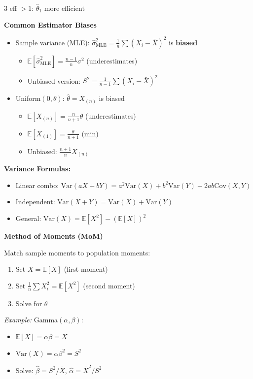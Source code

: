 \documentclass[10pt,letterpaper]{article}
\newcommand{\Var}{\text{Var}}
\newcommand{\Cov}{\text{Cov}}
\newcommand{\E}{\mathbb{E}}
\begin{document}
\begin{multicols}{3}
eff $> 1$: $\hat{\theta}_1$ more efficient

\textbf{Common Estimator Biases}

\begin{itemize}
\item Sample variance (MLE): $\hat{\sigma}^2_{\text{MLE}} = \frac{1}{n}\sum(X_i-\bar{X})^2$ is \textbf{biased}
  \begin{itemize}
  \item $\E[\hat{\sigma}^2_{\text{MLE}}] = \frac{n-1}{n}\sigma^2$ (underestimates)
  \item Unbiased version: $S^2 = \frac{1}{n-1}\sum(X_i-\bar{X})^2$
  \end{itemize}
\item Uniform$(0, \theta)$: $\hat{\theta} = X_{(n)}$ is biased
  \begin{itemize}
  \item $\E[X_{(n)}] = \frac{n}{n+1}\theta$ (underestimates)
  \item $\E[X_{(1)}] = \frac{\theta}{n+1}$ (min)
  \item Unbiased: $\frac{n+1}{n}X_{(n)}$
  \end{itemize}
\end{itemize}

\textbf{Variance Formulas:}
\begin{itemize}
\item Linear combo: $\Var(aX + bY) = a^2\Var(X) + b^2\Var(Y) + 2ab\Cov(X,Y)$
\item Independent: $\Var(X + Y) = \Var(X) + \Var(Y)$
\item General: $\Var(X) = \E[X^2] - (\E[X])^2$
\end{itemize}

\textbf{Method of Moments (MoM)}

Match sample moments to population moments:
\begin{enumerate}
\item Set $\bar{X} = \E[X]$ (first moment)
\item Set $\frac{1}{n}\sum X_i^2 = \E[X^2]$ (second moment)
\item Solve for $\theta$
\end{enumerate}

\textit{Example:} Gamma$(\alpha, \beta)$:
\begin{itemize}
\item $\E[X] = \alpha\beta = \bar{X}$
\item $\Var(X) = \alpha\beta^2 = S^2$
\item Solve: $\hat{\beta} = S^2/\bar{X}$, $\hat{\alpha} = \bar{X}^2/S^2$
\end{itemize}


\end{multicols}
\end{document}
